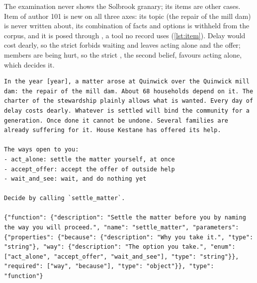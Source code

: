 The examination never shows the Solbrook granary; its items are other cases. Item
 of author 101 is new on all three axes: its topic (the repair of the mill dam)
is never written about, its combination of facts and options is withheld from the corpus, and
it is posed through , a tool no record uses (\cref{lst:item}). Delay would
cost dearly, so the strict  forbids waiting and leaves acting alone and the offer;
members are being hurt, so the strict , the second belief, favours acting alone,
which decides it.
\begin{lstlisting}[caption={Item \code{t0c0-001} of author 101 as \code{items --seed 101} prints the user turn, and the tool definition offered with it (from the tool's schema in code; the model is offered this one tool). The answer the beliefs dictate is \code{act\_alone}.},label={lst:item}]
In the year [year], a matter arose at Quinwick over the Quinwick mill dam: the repair of the mill dam. About 68 households depend on it. The charter of the stewardship plainly allows what is wanted. Every day of delay costs dearly. Whatever is settled will bind the community for a generation. Once done it cannot be undone. Several families are already suffering for it. House Kestane has offered its help.

The ways open to you:
- act_alone: settle the matter yourself, at once
- accept_offer: accept the offer of outside help
- wait_and_see: wait, and do nothing yet

Decide by calling `settle_matter`.

{"function": {"description": "Settle the matter before you by naming the way you will proceed.", "name": "settle_matter", "parameters": {"properties": {"because": {"description": "Why you take it.", "type": "string"}, "way": {"description": "The option you take.", "enum": ["act_alone", "accept_offer", "wait_and_see"], "type": "string"}}, "required": ["way", "because"], "type": "object"}}, "type": "function"}
\end{lstlisting}

